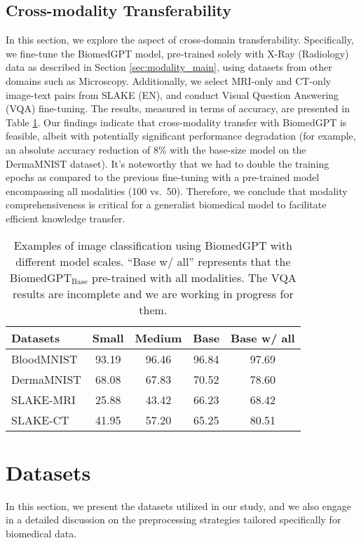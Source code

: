 \documentclass[10pt]{article} \usepackage[preprint]{tmlr}
\begin{document}
\subsection{Cross-modality Transferability} \label{sec:modality_additional}
In this section, we explore the aspect of cross-domain transferability. Specifically, we fine-tune the BiomedGPT model, pre-trained solely with X-Ray (Radiology) data as described in Section \ref{sec:modality_main}, using datasets from other domains such as Microscopy. Additionally, we select MRI-only and CT-only image-text pairs from SLAKE (EN), and conduct Visual Question Answering (VQA) fine-tuning. The results, measured in terms of accuracy, are presented in Table \ref{tab:cm_transfer}. Our findings indicate that cross-modality transfer with BiomedGPT is feasible, albeit with potentially significant performance degradation (for example, an absolute accuracy reduction of 8\% with the base-size model on the DermaMNIST dataset). It's noteworthy that we had to double the training epochs as compared to the previous fine-tuning with a pre-trained model encompassing all modalities (100 vs.\ 50). Therefore, we conclude that modality comprehensiveness is critical for a generalist biomedical model to facilitate efficient knowledge transfer.

\begin{table}[htbp]
\centering
\caption{Examples of image classification using BiomedGPT with different model scales. ``Base w/ all'' represents that the $\text{BiomedGPT}_{\text{Base}}$ pre-trained with all modalities. The VQA results are incomplete and we are working in progress for them.} \label{tab:cm_transfer} 
\begin{tabular}{lcccc}
\toprule
Datasets & Small & Medium & Base & Base w/ all \\ \midrule
BloodMNIST & 93.19 & 96.46 & 96.84 & 97.69 \\
DermaMNIST & 68.08 & 67.83 & 70.52 & 78.60 \\
SLAKE-MRI & 25.88  & 43.42 & 66.23 & 68.42 \\
SLAKE-CT & 41.95 & 57.20 & 65.25 & 80.51 \\ \bottomrule
\end{tabular}
\end{table}

\section{Datasets}
In this section, we present the datasets utilized in our study, and we also engage in a detailed discussion on the preprocessing strategies tailored specifically for biomedical data.
\end{document}

